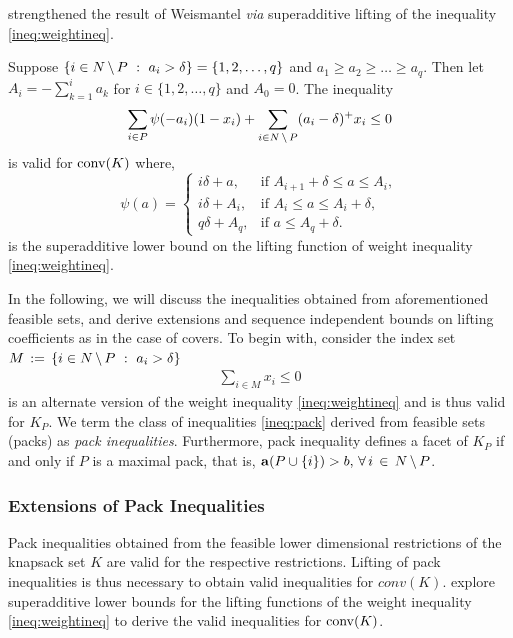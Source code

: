\documentclass[10pt,twoside]{amsart}
\begin{document}
\atam \cite{Atamturk2005} strengthened the result of Weismantel \cite{Weismantel97} \textit{via} superadditive lifting of the inequality \eqref{ineq:weightineq}.

\begin{prop}
  Suppose $\left\{ {i\in N\,\backslash\, P} \ : \ {a_i > \delta} \right\} = \{1,2,\ldots, q\}$ and $a_1 \geq a_2 \geq \ldots \geq a_q$. Then let $A_i = - \sum_{k=1}^i a_k$ for $i \in \{1,2,\ldots, q\}$ and $A_0 = 0$. The inequality
  \begin{align*}
    \sum_{i \in P} \psi(-a_i) (1-x_i) + \sum_{i \in N\,\backslash\, P} (a_i - \delta)^+ x_i \leq 0
  \end{align*}
  is valid for $\operatorname{conv}(K)$ where,
  $$
        \psi(a) =   \begin{cases}
                       i\delta + a, & \mbox{if } A_{i+1} + \delta \leq a \leq A_i,\\
                       i\delta + A_i, &  \mbox{if } A_{i} \leq a \leq A_i + \delta,\\
                       q\delta + A_q, &  \mbox{if } a \leq A_q + \delta.
                    \end{cases}
  $$
  is the superadditive lower bound on the lifting function of weight inequality \eqref{ineq:weightineq}.
\end{prop}

In the following, we will discuss the inequalities obtained from aforementioned feasible sets, and derive extensions and sequence independent bounds on lifting coefficients as in the case of covers. To begin with, consider the index set $M \,:=\, \left\{ {i\in N\,\backslash\, P} \ : \ {a_i > \delta} \right\}$
\begin{align}
  \sum_{i \in M} x_i \leq 0 \label{ineq:pack}
\end{align}
is an alternate version of the weight inequality \eqref{ineq:weightineq} and is thus valid for $K_P$. We term the class of inequalities \eqref{ineq:pack} derived from feasible sets (packs) as \textit{pack inequalities}. Furthermore, pack inequality defines a facet of $K_P$ if and only if $P$ is a maximal pack, that is, $\mathbf{a}(P\cup \{i\}) > b,\,\forall\,i\,\in\, N\,\backslash\, P$.

\subsubsection{Extensions of Pack Inequalities}\hfill

Pack inequalities obtained from the feasible lower dimensional restrictions of the knapsack set $K$ are valid for the respective restrictions. Lifting of pack inequalities is thus necessary to obtain valid inequalities for $conv(K)$.  \atam \cite{Atamturk2005} explore superadditive lower bounds for the lifting functions of the weight inequality \eqref{ineq:weightineq} to derive the valid inequalities for $\operatorname{conv}(K)$.
\end{document}
